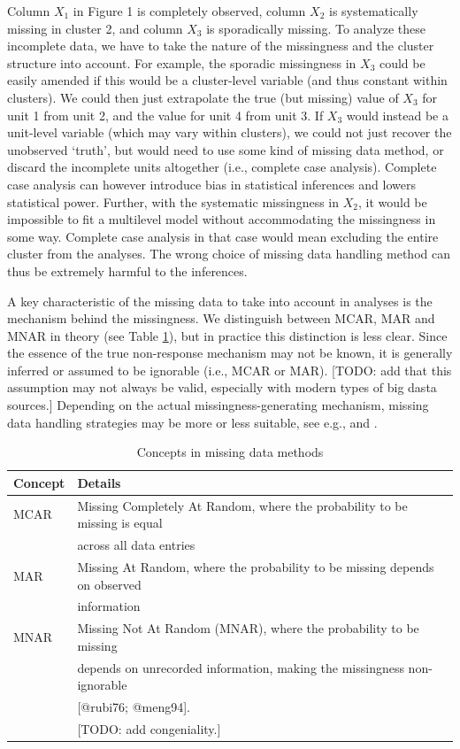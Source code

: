 \documentclass[
]{jss}
\begin{document}
Column \(X_1\) in Figure 1 is completely observed, column \(X_2\) is
systematically missing in cluster 2, and column \(X_3\) is sporadically
missing. To analyze these incomplete data, we have to take the nature of
the missingness and the cluster structure into account. For example, the
sporadic missingness in \(X_3\) could be easily amended if this would be
a cluster-level variable (and thus constant within clusters). We could
then just extrapolate the true (but missing) value of \(X_3\) for unit 1
from unit 2, and the value for unit 4 from unit 3. If \(X_3\) would
instead be a unit-level variable (which may vary within clusters), we
could not just recover the unobserved `truth', but would need to use
some kind of missing data method, or discard the incomplete units
altogether (i.e., complete case analysis). Complete case analysis can
however introduce bias in statistical inferences and lowers statistical
power. Further, with the systematic missingness in \(X_2\), it would be
impossible to fit a multilevel model without accommodating the
missingness in some way. Complete case analysis in that case would mean
excluding the entire cluster from the analyses. The wrong choice of
missing data handling method can thus be extremely harmful to the
inferences.

A key characteristic of the missing data to take into account in
analyses is the mechanism behind the missingness. We distinguish between
MCAR, MAR and MNAR in theory (see Table \ref{tab:miss}), but in practice
this distinction is less clear. Since the essence of the true
non-response mechanism may not be known, it is generally inferred or
assumed to be ignorable (i.e., MCAR or MAR). {[}TODO: add that this
assumption may not always be valid, especially with modern types of big
dasta sources.{]} Depending on the actual missingness-generating
mechanism, missing data handling strategies may be more or less
suitable, see e.g., \citet{yuce08} and \citet{hox15}.

\begin{table}[tb]
\caption{Concepts in missing data methods}
\label{tab:miss}
\centering
\begin{tabular}{ll}
\hline
\textbf{Concept} & \textbf{Details}   \\
\hline
MCAR    & Missing Completely At Random, where the probability to be missing is equal \\
& across all data entries \\
MAR     & Missing At Random, where the probability to be missing depends on observed \\
& information \\
MNAR    & Missing Not At Random (MNAR), where the probability to be missing \\
& depends on unrecorded information, making the missingness non-ignorable \\
& [@rubi76; @meng94]. \\
& [TODO: add congeniality.] \\
\hline
\end{tabular}
\end{table}
\end{document}
